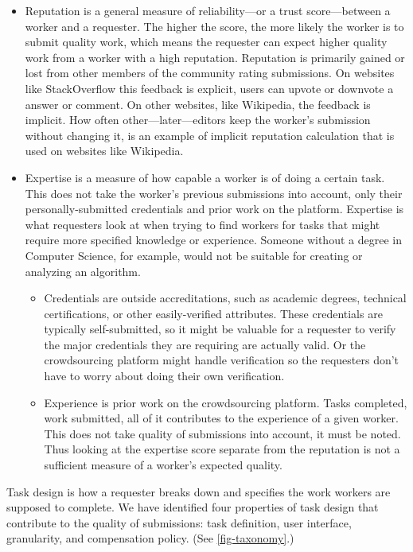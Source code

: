 \documentclass{sig-alternate-05-2015}
\begin{document}
	\begin{itemize}
	\item Reputation is a general measure of reliability---or a trust score---between a worker and a requester. The higher the score, the more likely the worker is to submit quality work, which means the requester can expect higher quality work from a worker with a high reputation. Reputation is primarily gained or lost from other members of the community rating submissions. \cite{de2011reputation} On websites like StackOverflow this feedback is explicit, users can upvote or downvote a answer or comment. On other websites, like Wikipedia, the feedback is implicit. How often other---later---editors keep the worker's submission without changing it, is an example of implicit reputation calculation that is used on websites like Wikipedia. 
	
	\item Expertise is a measure of how capable a worker is of doing a certain task. \cite{schall2012expert} This does not take the worker's previous submissions into account, only their personally-submitted credentials and prior work on the platform. Expertise is what requesters look at when trying to find workers for tasks that might require more specified knowledge or experience. Someone without a degree in Computer Science, for example, would not be suitable for creating or analyzing an algorithm.

	\begin{itemize}
		\item Credentials are outside accreditations, such as academic degrees, technical certifications, or other easily-verified attributes. These credentials are typically self-submitted, so it might be valuable for a requester to verify the major credentials they are requiring are actually valid. Or the crowdsourcing platform might handle verification so the requesters don't have to worry about doing their own verification.
		
		\item Experience is prior work on the crowdsourcing platform. Tasks completed, work submitted, all of it contributes to the experience of a given worker. This does not take quality of submissions into account, it must be noted. Thus looking at the expertise score separate from the reputation is not a sufficient measure of a worker's expected quality.
	\end{itemize}
	\end{itemize}

	Task design is how a requester breaks down and specifies the work workers are supposed to complete. We have identified four properties of task design that contribute to the quality of submissions: task definition, user interface, granularity, and compensation policy. (See \cref{fig-taxonomy}.)
	
\end{document}
